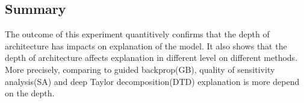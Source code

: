 
\subsection{Summary}
The outcome of this experiment quantitively confirms that the depth of architecture has impacts on explanation of the model. It also shows that  the depth of architecture affects explanation in different level on different methods. More precisely, comparing to guided backprop(GB), quality of sensitivity analysis(SA) and deep Taylor decomposition(DTD) explanation is more depend on the depth.


